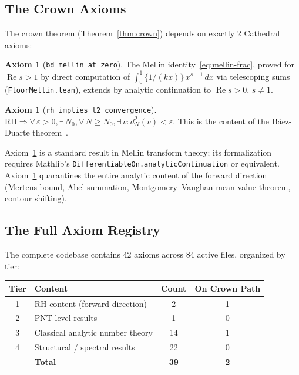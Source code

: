 \documentclass[11pt,a4paper]{article}
\theoremstyle{plain}
\theoremstyle{definition}
\newtheorem{axiombox}[theorem]{Axiom}
\theoremstyle{remark}
\newcommand{\RH}{\mathrm{RH}}
\newcommand{\re}{\operatorname{Re}}
\newcommand{\fract}[1]{\{#1\}}
\newcommand{\lean}[1]{\texttt{#1}}
\begin{document}
\subsection{The Crown Axioms}

The crown theorem (Theorem~\ref{thm:crown}) depends on exactly 2
Cathedral axioms:

\begin{axiombox}[\lean{bd\_mellin\_at\_zero}]
\label{ax:mellin}
The Mellin identity~\eqref{eq:mellin-frac}, proved for $\re s > 1$
by direct computation of $\int_0^1 \fract{1/(kx)}\,x^{s-1}\,dx$
via telescoping sums (\lean{FloorMellin.lean}), extends by analytic
continuation to $\re s > 0$, $s \neq 1$.
\end{axiombox}

\begin{axiombox}[\lean{rh\_implies\_l2\_convergence}]
\label{ax:l2}
$\RH \Rightarrow \forall\,\varepsilon > 0, \exists\,N_0,
\forall\,N \geq N_0, \exists\,v : d_N^2(v) < \varepsilon$.
This is the content of the B\'aez-Duarte theorem~\cite{baezduarte2003}.
\end{axiombox}

Axiom~\ref{ax:mellin} is a standard result in Mellin transform theory;
its formalization requires Mathlib's \lean{DifferentiableOn.analyticContinuation}
or equivalent. Axiom~\ref{ax:l2} quarantines the entire analytic content
of the forward direction (Mertens bound, Abel summation, Montgomery--Vaughan
mean value theorem, contour shifting).

\subsection{The Full Axiom Registry}

The complete codebase contains 42 axioms across 84 active files,
organized by tier:

\begin{center}
\begin{tabular}{@{}clcc@{}}
\toprule
\textbf{Tier} & \textbf{Content} & \textbf{Count} & \textbf{On Crown Path} \\
\midrule
1 & RH-content (forward direction) & 2 & 1 \\
2 & PNT-level results & 1 & 0 \\
3 & Classical analytic number theory & 14 & 1 \\
4 & Structural / spectral results & 22 & 0 \\
\midrule
& \textbf{Total} & \textbf{39} & \textbf{2} \\
\bottomrule
\end{tabular}
\end{center}
\end{document}
